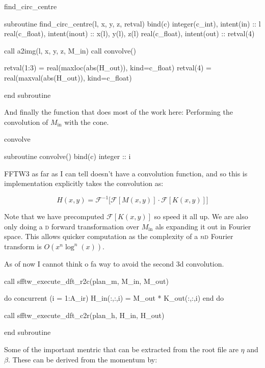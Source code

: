 \documentclass[10pt, a4paper]{article}
\begin{document}
\begin{codeblock}{find_circ_centre}
\begin{code}
subroutine find_circ_centre(l, x, y, z, retval) bind(c)
	integer(c_int), intent(in)  :: l
	real(c_float),  intent(inout)  :: x(l), y(l), z(l)
	real(c_float),  intent(out) :: retval(4)
	
	call a2img(l, x, y, z, M_in)
	call convolve()
	
	retval(1:3) = real(maxloc(abs(H_out)), kind=c_float)
	retval(4) = real(maxval(abs(H_out)), kind=c_float)
	
end subroutine
\end{code}
\end{codeblock}


And finally the function that does most of the work here: Performing the convolution of $M_\text{in}$ with the cone.

\begin{codeblock}{convolve}
\begin{code}
subroutine convolve() bind(c)
	integer :: i 
\end{code}

FFTW3 as far as I can tell doesn't have a convolution function, and so this is implementation explicitly takes the convolution as:

\begin{equation}
H(x,y) = \mathcal{F}^{-1}\big[\mathcal{F}[M(x,y)] \cdot \mathcal{F}[K(x,y)]\big]
\end{equation}

Note that we have precomputed $\mathcal{F}[K(x,y)]$ so speed it all up.
We are also only doing a \textsc{d} forward transformation over $M_\text{in}$ als expanding it out in Fourier space. This allows quicker computation as the complexity of a $n$\textsc{d} Fourier transform is $O(x^n \log^n(x))$. 

As of now I cannot think o fa way to avoid the second 3d convolution.

\begin{code}
	call sfftw_execute_dft_r2c(plan_m, M_in, M_out)
	
	do concurrent (i = 1:A_ir)
		H_in(:,:,i) = M_out * K_out(:,:,i)
	end do 
	
	call sfftw_execute_dft_c2r(plan_h, H_in, H_out)
	
end subroutine
\end{code}
\end{codeblock}

Some of the important mentric that can be extracted from the root file are $\eta$ and $\beta$. These can be derived from the momentum by:
\end{document}
